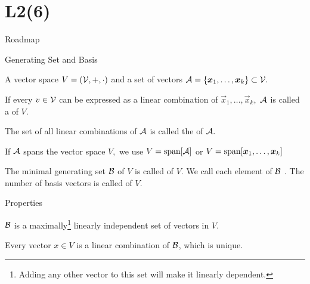 \documentclass[handout,fleqn,aspectratio=169]{beamer}
\begin{document}
\section{L2(6)}
\begin{frame}{Roadmap}

\plitemsep 0.1in

\bce[(1)] 
\item {}

\item {}

\item {}
\ece
\end{frame}


\begin{frame}{Generating Set and Basis}

\plitemsep 0.1in

\bci 
\item {} A vector space $V=(\mathcal V, +, \cdot)$ and a set of vectors $\mathcal A = \{\bm{x}_1, \ldots, \bm{x}_k \} \subset \mathcal V.$
\vspace{-0.3cm}
\bci
\item If every $v \in \mathcal V$ can be expressed as a linear combination of $\vec{x}_1, \ldots, \vec{x}_k,$ $\mathcal A$ is called a  of $V.$
\item The set of all linear combinations of $\mathcal A$ is called the  of $\mathcal A.$
\item If $\mathcal A$ spans the vector space $V,$ we use $V = \text{span}[\mathcal A]$ or $V = \text{span}[\bm{x}_1, \ldots, \bm{x}_k]$
\eci

\item {} The minimal generating set $\mathcal B$ of $V$ is called  of $V.$ We call each element of $\mathcal B$ . The number of basis vectors is called  of $V.$

\item Properties
\bci
\item $\mathcal B$ is a maximally\footnote{Adding any other vector to this set will make it linearly dependent.} linearly independent set of vectors in $V.$
\item Every vector $x \in V$ is a linear combination of $\mathcal B$, which is unique. 
\eci
\eci

\end{frame}
\end{document}
